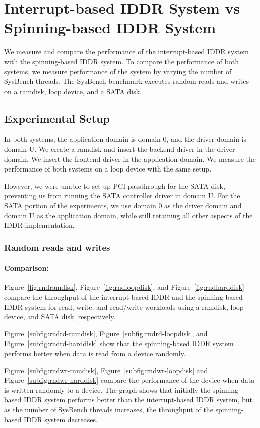 \section{Interrupt-based IDDR System vs Spinning-based IDDR System}
We measure and compare the performance of the interrupt-based IDDR system
with the spinning-based IDDR system. To compare the performance of both
systems, we measure performance of the system by varying the number of
SysBench threads. The SysBench benchmark executes random reads and writes 
on a ramdisk, loop device, and a SATA disk.

\subsection*{Experimental Setup}
In both systems, the application domain is domain 0, and the driver domain
is domain U.  We create a ramdisk and insert the backend driver in the
driver domain.  We insert the frontend driver in the application domain.
We measure the performance of both systems on a loop device with the
same setup.

However, we were unable to set up PCI passthrough for the SATA disk,
preventing us from running the SATA controller driver in domain U.
For the SATA portion of the experiments, we use domain 0 as the
driver domain and domain U as the application domain, while still
retaining all other aspects of the IDDR implementation.

\subsubsection*{Random reads and writes}

\paragraph{Comparison:}

Figure~\ref{fig:rndramdisk}, Figure~\ref{fig:rndloopdisk}, and
Figure~\ref{fig:rndharddisk} compare the throughput of the interrupt-based
IDDR and the spinning-based IDDR system for read, write, and read/write
workloads using a ramdisk, loop device, and SATA disk, respectively.

Figure~\ref{subfig:rndrd-ramdisk}, Figure~\ref{subfig:rndrd-loopdisk},
and Figure~\ref{subfig:rndrd-harddisk} show that the spinning-based IDDR
system performs better when data is read from a device randomly.

Figure~\ref{subfig:rndwr-ramdisk}, Figure~\ref{subfig:rndwr-loopdisk}
and Figure~\ref{subfig:rndwr-harddisk} compare the performance of
the device when data is written randomly to a device. The graph shows
that initially the spinning-based IDDR system performs better than the
interrupt-based IDDR system, but as the number of SysBench threads increases,
the throughput of the spinning-based IDDR system decreases.

